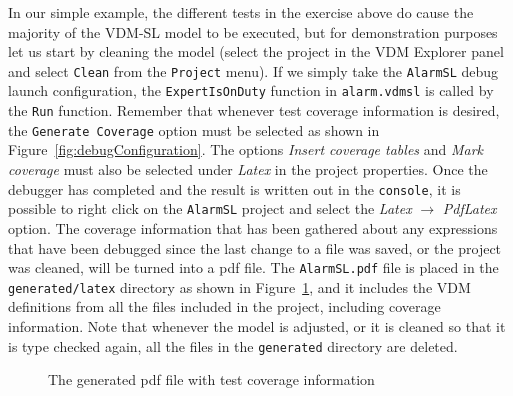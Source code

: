 In our simple example, the different tests in the exercise above do cause the majority of the VDM-SL model to be executed, but for demonstration purposes let us start by cleaning the model (select the project in the VDM Explorer panel and select \texttt{Clean} from the \texttt{Project} menu). If we simply take the \texttt{AlarmSL} debug launch configuration, the \verb|ExpertIsOnDuty| function in \verb|alarm.vdmsl| is called by the \texttt{Run} function. Remember that whenever test coverage information is desired, the \texttt{Generate Coverage} option must be selected as shown in Figure~\ref{fig:debugConfiguration}.  The options \emph{Insert coverage tables} and \emph{Mark coverage} must also be selected under \emph{Latex} in the project properties.  Once the debugger has completed and the result is written out in the \texttt{console}, it is possible to right click on the \texttt{AlarmSL} project and select the \emph{Latex} $\rightarrow $ \emph{PdfLatex} option.  The coverage information that has been gathered about any expressions that have been debugged since the last change to a file was saved, or the project was cleaned, will be turned into a pdf file. The \texttt{AlarmSL.pdf} file is placed in the \texttt{generated/latex} directory as shown in Figure~\ref{fig:testcov}, and it includes the VDM definitions from all the files included in the project, including coverage information. Note that whenever the model is adjusted, or it is cleaned so that it is type checked again, all the files in the \texttt{generated} directory are deleted.
%
\begin{figure}[tb]
\begin{center}
\end{center}
\caption{The generated pdf file with test coverage information\label{fig:testcov}}
\end{figure}
